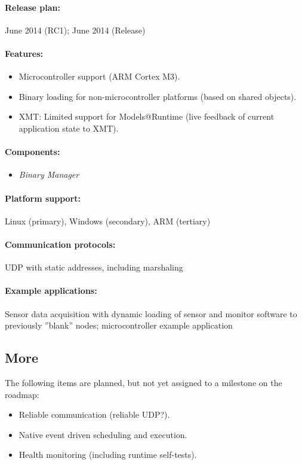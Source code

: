 \paragraph{Release plan:} June 2014 (RC1); June 2014 (Release)

\paragraph{Features:}
\begin{itemize}
	\item Microcontroller support (ARM Cortex M3).
	\item Binary loading for non-microcontroller platforms (based on shared objects).
	\item XMT: Limited support for Models@Runtime (live feedback of current application state to XMT).
\end{itemize}

\paragraph{Components:}
\begin{itemize}
	\item \emph{Binary Manager}
\end{itemize}

\paragraph{Platform support:} Linux (primary), Windows (secondary), ARM (tertiary)
\paragraph{Communication protocols:} UDP with static addresses, including marshaling%
\paragraph{Example applications:} Sensor data acquisition with dynamic loading of sensor and monitor software to previously ''blank'' nodes; microcontroller example application



\subsection{More}

The following items are planned, but not yet assigned to a milestone on the roadmap:
\begin{itemize}
	\item Reliable communication (reliable UDP?).
	\item Native event driven scheduling and execution.
	\item Health monitoring (including runtime self-tests).
\end{itemize}
